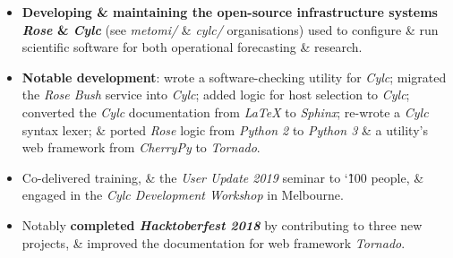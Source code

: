 \documentclass[10pt,a4paper]{protocol}
\begin{document}
\made{\today}




\begin{fullwidth}
\makeheader
\end{fullwidth}


\begin{itemize}
	\item \textbf{Developing \& maintaining the open-source infrastructure systems  \textit{Rose} \& \textit{Cylc}} (see \textit{metomi/} \& \textit{cylc/} {\color{body}\faGithub} organisations) used to configure \& run scientific software for both operational forecasting \& research.
	\item \textbf{Notable development}: wrote a software-checking utility for \textit{Cylc}; migrated the \textit{Rose Bush} service into \textit{Cylc}; added logic for host selection to \textit{Cylc}; converted the \textit{Cylc} documentation from \textit{LaTeX} to \textit{Sphinx}; re-wrote a \textit{Cylc} syntax lexer; \& ported \textit{Rose} logic from \textit{Python 2} to \textit{Python 3} \& a utility's web framework from \textit{CherryPy} to \textit{Tornado}.
	\item Co-delivered training, \& the \textit{User Update 2019} seminar to \char`\~ 100 people, \& engaged in the \textit{Cylc Development Workshop} in Melbourne.
\end{itemize}
\divider
{}
\begin{itemize}
	\item Notably \textbf{completed \textit{Hacktoberfest 2018}} by contributing to three new projects, \& improved the documentation for web framework \textit{Tornado}.
\end{itemize}
\end{document}
